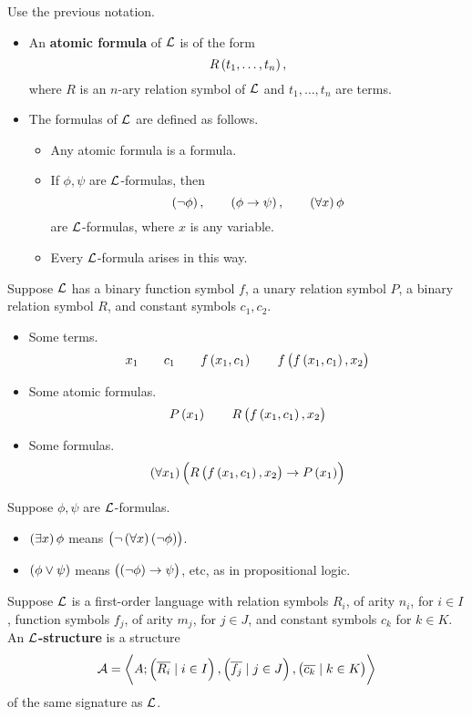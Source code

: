 
\begin{definition}
Use the previous notation.
\begin{itemize}
\item An \textbf{atomic formula} of $ \mathcal{L} $ is of the form
$$ R\br{t_1, \dots, t_n}, $$
where $ R $ is an $ n $-ary relation symbol of $ \mathcal{L} $ and $ t_1, \dots, t_n $ are terms.
\item The formulas of $ \mathcal{L} $ are defined as follows.
\begin{itemize}
\item Any atomic formula is a formula.
\item If $ \phi, \psi $ are $ \mathcal{L} $-formulas, then
$$ \notb{\phi}, \qquad \impb{\phi}{\psi}, \qquad \fab{x}\phi $$
are $ \mathcal{L} $-formulas, where $ x $ is any variable.
\item Every $ \mathcal{L} $-formula arises in this way.
\end{itemize}
\end{itemize}
\end{definition}

\begin{example*}
Suppose $ \mathcal{L} $ has a binary function symbol $ f $, a unary relation symbol $ P $, a binary relation symbol $ R $, and constant symbols $ c_1, c_2 $.
\begin{itemize}
\item Some terms.
$$ x_1 \qquad c_1 \qquad f\br{x_1, c_1} \qquad f\br{f\br{x_1, c_1}, x_2} $$
\item Some atomic formulas.
$$ P\br{x_1} \qquad R\br{f\br{x_1, c_1}, x_2} $$
\item Some formulas.
$$ \fab{x_1}\impb{R\br{f\br{x_1, c_1}, x_2}}{P\br{x_1}} $$
\end{itemize}
\end{example*}

\begin{definition}
Suppose $ \phi, \psi $ are $ \mathcal{L} $-formulas.
\begin{itemize}
\item $ \teb{x}\phi $ means $ \notb{\fab{x}\notb{\phi}} $.
\item $ \orb{\phi}{\psi} $ means $ \impb{\notb{\phi}}{\psi} $, etc, as in propositional logic.
\end{itemize}
\end{definition}

\pagebreak

\begin{definition}
Suppose $ \mathcal{L} $ is a first-order language with relation symbols $ R_i $, of arity $ n_i $, for $ i \in I $, function symbols $ f_j $, of arity $ m_j $, for $ j \in J $, and constant symbols $ c_k $ for $ k \in K $. An \textbf{$ \mathcal{L} $-structure} is a structure
$$ \AA = \abr{A; \br{\overline{R_i} \mid i \in I}, \br{\overline{f_j} \mid j \in J}, \br{\overline{c_k} \mid k \in K}} $$
of the same signature as $ \mathcal{L} $.
\end{definition}

